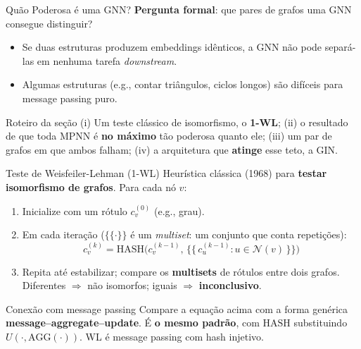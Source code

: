 \documentclass[aspectratio=169,xcolor=dvipsnames]{beamer}
\begin{document}
  \begin{frame}{Quão Poderosa é uma GNN?}
    \textbf{Pergunta formal}: que pares de grafos uma GNN consegue distinguir?

    \vspace{0.4em}
    \begin{itemize}
      \item Se duas estruturas produzem embeddings idênticos, a GNN não pode
            separá-las em nenhuma tarefa \textit{downstream}.
      \item Algumas estruturas (e.g., contar triângulos, ciclos longos) são
            difíceis para message passing puro.
    \end{itemize}

    \vspace{0.5em}
    \begin{block}{Roteiro da seção}
      (i) Um teste clássico de isomorfismo, o \textbf{1-WL}; (ii) o resultado de
      que toda MPNN é \textbf{no máximo} tão poderosa quanto ele; (iii) um par de
      grafos em que ambos falham; (iv) a arquitetura que \textbf{atinge}
      esse teto, a GIN.
    \end{block}
  \end{frame}

  \begin{frame}{Teste de Weisfeiler-Lehman (1-WL)}
    Heurística clássica (1968) para \textbf{testar isomorfismo de grafos}.
    Para cada nó $v$:

    \vspace{0.3em}
    \begin{enumerate}
      \item Inicialize com um rótulo $c^{(0)}_v$ (e.g., grau).
      \item Em cada iteração ($\{\!\!\{\cdot\}\!\!\}$ é um \textit{multiset}: um conjunto que conta repetições):
        \[
          c^{(k)}_v = \mathrm{HASH}\!\bigl(c^{(k-1)}_v,\, \{\!\!\{\, c^{(k-1)}_u : u \in \mathcal{N}(v) \,\}\!\!\}\bigr)
        \]
      \item Repita até estabilizar; compare os \textbf{multisets} de rótulos
            entre dois grafos. Diferentes $\Rightarrow$ não isomorfos;
            iguais $\Rightarrow$ \textbf{inconclusivo}.
    \end{enumerate}

    \vspace{0.4em}
    \begin{block}{Conexão com message passing}
      Compare a equação acima com a forma genérica \textbf{message--aggregate--update}.
      É \textbf{o mesmo padrão}, com $\mathrm{HASH}$ substituindo
      $U(\cdot, \mathrm{AGG}(\cdot))$. WL é message passing com hash injetivo.
    \end{block}
  \end{frame}
\end{document}
